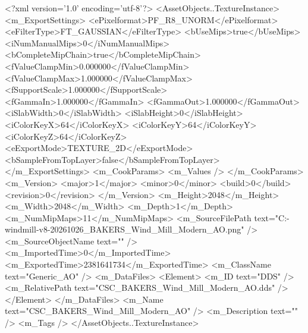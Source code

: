 <?xml version='1.0' encoding='utf-8'?>
<AssetObjects..TextureInstance>
  <m_ExportSettings>
    <ePixelformat>PF_R8_UNORM</ePixelformat>
    <eFilterType>FT_GAUSSIAN</eFilterType>
    <bUseMips>true</bUseMips>
    <iNumManualMips>0</iNumManualMips>
    <bCompleteMipChain>true</bCompleteMipChain>
    <fValueClampMin>0.000000</fValueClampMin>
    <fValueClampMax>1.000000</fValueClampMax>
    <fSupportScale>1.000000</fSupportScale>
    <fGammaIn>1.000000</fGammaIn>
    <fGammaOut>1.000000</fGammaOut>
    <iSlabWidth>0</iSlabWidth>
    <iSlabHeight>0</iSlabHeight>
    <iColorKeyX>64</iColorKeyX>
    <iColorKeyY>64</iColorKeyY>
    <iColorKeyZ>64</iColorKeyZ>
    <eExportMode>TEXTURE_2D</eExportMode>
    <bSampleFromTopLayer>false</bSampleFromTopLayer>
  </m_ExportSettings>
  <m_CookParams>
    <m_Values />
  </m_CookParams>
  <m_Version>
    <major>1</major>
    <minor>0</minor>
    <build>0</build>
    <revision>0</revision>
  </m_Version>
  <m_Height>2048</m_Height>
  <m_Width>2048</m_Width>
  <m_Depth>1</m_Depth>
  <m_NumMipMaps>11</m_NumMipMaps>
  <m_SourceFilePath text="C:\Users\Shadow\Desktop\Codex\modern-windmill-v8-20261026\export\textures\CSC_BAKERS_Wind_Mill_Modern_AO.png" />
  <m_SourceObjectName text="" />
  <m_ImportedTime>0</m_ImportedTime>
  <m_ExportedTime>2381641734</m_ExportedTime>
  <m_ClassName text="Generic_AO" />
  <m_DataFiles>
    <Element>
      <m_ID text="DDS" />
      <m_RelativePath text="CSC_BAKERS_Wind_Mill_Modern_AO.dds" />
    </Element>
  </m_DataFiles>
  <m_Name text="CSC_BAKERS_Wind_Mill_Modern_AO" />
  <m_Description text="" />
  <m_Tags />
</AssetObjects..TextureInstance>